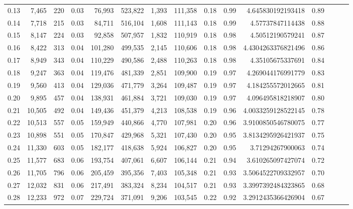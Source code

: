 \begin{tabular}{rrrrrrrrrrrrrrr}
0.13 &   7,465 &    220 &  0.03 &   76,993 &  523,822 &    1,393 &  111,358 &  0.18 &  0.99 &     4.645830192193418 &      0.89 \\
0.14 &   7,718 &    215 &  0.03 &   84,711 &  516,104 &    1,608 &  111,143 &  0.18 &  0.99 &      4.57737847114438 &      0.88 \\
0.15 &   8,147 &    224 &  0.03 &   92,858 &  507,957 &    1,832 &  110,919 &  0.18 &  0.98 &      4.50512190579241 &      0.87 \\
0.16 &   8,422 &    313 &  0.04 &  101,280 &  499,535 &    2,145 &  110,606 &  0.18 &  0.98 &    4.4304263376821496 &      0.86 \\
0.17 &   8,949 &    343 &  0.04 &  110,229 &  490,586 &    2,488 &  110,263 &  0.18 &  0.98 &      4.35105675337691 &      0.84 \\
0.18 &   9,247 &    363 &  0.04 &  119,476 &  481,339 &    2,851 &  109,900 &  0.19 &  0.97 &     4.269044176991779 &      0.83 \\
0.19 &   9,560 &    413 &  0.04 &  129,036 &  471,779 &    3,264 &  109,487 &  0.19 &  0.97 &     4.184255572012665 &      0.81 \\
0.20 &   9,895 &    457 &  0.04 &  138,931 &  461,884 &    3,721 &  109,030 &  0.19 &  0.97 &     4.096495818218907 &      0.80 \\
0.21 &  10,505 &    492 &  0.04 &  149,436 &  451,379 &    4,213 &  108,538 &  0.19 &  0.96 &    4.0033259128522145 &      0.78 \\
0.22 &  10,513 &    557 &  0.05 &  159,949 &  440,866 &    4,770 &  107,981 &  0.20 &  0.96 &    3.9100850546780075 &      0.77 \\
0.23 &  10,898 &    551 &  0.05 &  170,847 &  429,968 &    5,321 &  107,430 &  0.20 &  0.95 &    3.8134295926421937 &      0.75 \\
0.24 &  11,330 &    603 &  0.05 &  182,177 &  418,638 &    5,924 &  106,827 &  0.20 &  0.95 &      3.71294267900063 &      0.74 \\
0.25 &  11,577 &    683 &  0.06 &  193,754 &  407,061 &    6,607 &  106,144 &  0.21 &  0.94 &     3.610265097427074 &      0.72 \\
0.26 &  11,705 &    796 &  0.06 &  205,459 &  395,356 &    7,403 &  105,348 &  0.21 &  0.93 &    3.5064522709332957 &      0.70 \\
0.27 &  12,032 &    831 &  0.06 &  217,491 &  383,324 &    8,234 &  104,517 &  0.21 &  0.93 &    3.3997392484323865 &      0.68 \\
0.28 &  12,233 &    972 &  0.07 &  229,724 &  371,091 &    9,206 &  103,545 &  0.22 &  0.92 &    3.2912435366426904 &      0.67 \\

\end{tabular}
